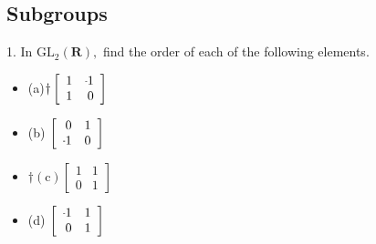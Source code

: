 \subsection{Subgroups}
\begin{mdframed}[style=darkQuesion]
1. In $\mathrm{GL}_{2}(\mathbf{R}),$ find the order of each of the following elements.
\begin{multicols}{4}
\begin{itemize}
\item[]{
    (a)$\dagger\left[\begin{array}{rr}1 & \m 1 \\
          1 & 0\end{array}\right]$}
\item[]{
    (b) $\left[\begin{array}{rr}0 & 1 \\
          \m 1 & 0\end{array}\right]$}
\item[]{
    $\dagger(\mathrm{c})\left[\begin{array}{ll}1 & 1 \\
          0 & 1\end{array}\right]$}
\item[]{
    (d) $\left[\begin{array}{rr}\m 1 & 1 \\
          0 & 1\end{array}\right]$}
\end{itemize}
\end{multicols}
\vspace{.5cm}
\end{mdframed}

